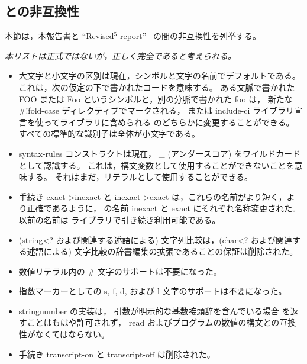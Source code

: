 

\subsection*{\rfivers との非互換性}
\label{incompatibilities}

本節は，本報告書と ``Revised$^5$ report''~\cite{R5RS} の間の非互換性を列挙する。

{\em 本リストは正式ではないが，正しく完全であると考えられる。}


\begin{itemize}

\item 大文字と小文字の区別は現在，シンボルと文字の名前でデフォルトである。
これは，次の仮定の下で書かれたコードを意味する。
ある文脈で書かれた {\cf FOO} または {\cf Foo} というシンボルと，別の分脈で書かれた {\cf foo} は，
新たな {\cf \#!fold-case} ディレクティブでマークされる，
または {\cf include-ci} ライブラリ宣言を使ってライブラリに含められる
のどちらかに変更することができる。
すべての標準的な識別子は全体が小文字である。

\item {\cf syntax-rules} コンストラクトは現在， {\em \_} (アンダースコア) をワイルドカードとして認識する。
これは，構文変数として使用することができないことを意味する。
それはまだ，リテラルとして使用することができる。

\item \rfivers 手続き {\cf exact->inexact} と {\cf inexact->exact} は，これらの名前がより短く，より正確であるように，
\rsixrs の名前 {\cf inexact} と {\cf exact} にそれぞれ名称変更された。
以前の名前は \rfivers ライブラリで引き続き利用可能である。

\item ({\cf string<?} および関連する述語による) 文字列比較は，({\cf char<?} および関連する述語による) 文字比較の辞書編集の拡張であることの保証は削除された。

\item 数値リテラル内の \# 文字のサポートは不要になった。

\item 指数マーカーとしての {\cf s}, {\cf f}, {\cf d}, および {\cf l} 文字のサポートは不要になった。

\item {\cf string\coerce{}number} の実装は，
引数が明示的な基数接頭辞を含んでいる場合 \schfalse{} を返すことはもはや許可されず，
{\cf read} およびプログラムの数値の構文との互換性がなくてはならない。

\item 手続き {\cf transcript-on} と {\cf transcript-off} は削除された。

\end{itemize}

